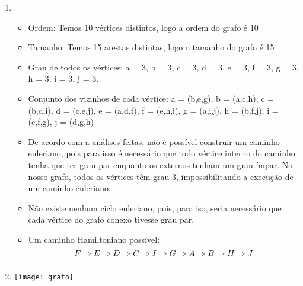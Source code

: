 \documentclass[11pt,reqno]{amsart}
\begin{document}
\begin{enumerate}
\item 
\begin{itemize}
	\item Ordem: Temos 10 vértices distintos, logo a ordem do grafo é 10
	\item Tamanho: Temos 15 arestas distintas, logo o tamanho do grafo é 15
	\item Grau de todos os vértices: a = 3, b = 3, c = 3, d = 3, e = 3, f = 3, g = 3, h = 3, i = 3, j = 3.
	\item Conjunto dos vizinhos de cada vértice: a = (b,e,g), b = (a,c,h), c = (b,d,i), d = (c,e,j), e = (a,d,f), f = (e,h,i), g = (a,i,j), h = (b,f,j), i = (c,f,g), j = (d,g,h)
	\item De acordo com a análises feitas, não é possível construir um caminho euleriano, pois para isso é necessário que todo vértice interno do caminho tenha que ter grau par enquanto os externos tenham um grau ímpar. No nosso grafo, todos os vértices têm grau 3, impossibilitando a execução de um caminho euleriano.
	\item Não existe nenhum ciclo euleriano, pois, para iso, seria necessário que cada vértice do grafo conexo tivesse grau par.
	\item Um caminho Hamiltoniano possível:\\\[F \xRightarrow[ ]{ } E \xRightarrow[ ]{ } D \xRightarrow[ ]{ } C \xRightarrow[ ]{ } I \xRightarrow[ ]{ } G \xRightarrow[ ]{ } A \xRightarrow[ ]{ } B \xRightarrow[ ]{ } H \xRightarrow[ ]{ } J\]
\end{itemize}
\vspace{0.3cm}


\item \texttt{[image: grafo]}
\vspace{0.3cm}


\end{enumerate}
\end{document}
